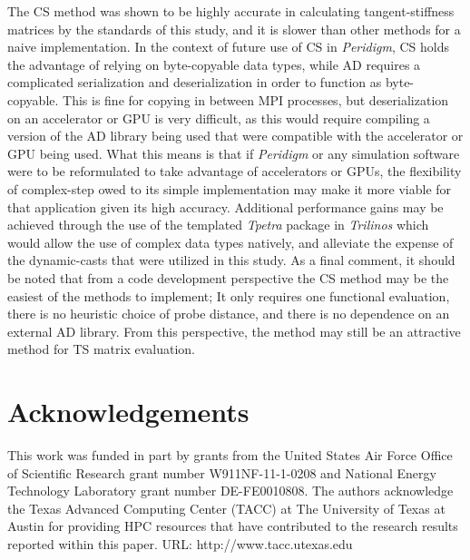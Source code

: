 \documentclass[preprint,12pt]{elsarticle}
\begin{document}
The CS method was shown to be highly accurate in calculating tangent-stiffness matrices by the standards of this study, and it is slower than other methods for a naive implementation. In the context of future use of CS in \emph{Peridigm}, CS holds the advantage of relying on byte-copyable data types, while AD requires a complicated serialization and deserialization in order to function as byte-copyable. This is fine for copying in between MPI processes, but deserialization on an accelerator or GPU is very difficult, as this would require compiling a version of the AD library being used that were compatible with the accelerator or GPU being used. What this means is that if \emph{Peridigm} or any simulation software were to be reformulated to take advantage of accelerators or GPUs, the flexibility of complex-step owed to its simple implementation may make it more viable for that application given its high accuracy. Additional performance gains may be achieved through the use of the templated \emph{Tpetra} package in \emph{Trilinos} which would allow the use of complex data types natively, and alleviate the expense of the dynamic-casts that were utilized in this study.  As a final comment, it should be noted that from a code development perspective the CS method may be the easiest of the methods to implement; It only requires one functional evaluation, there is no heuristic choice of probe distance, and there is no dependence on an external AD library.  From this perspective, the method may still be an attractive method for TS matrix evaluation.



\section{Acknowledgements}
\label{sec:ack}
This work was funded in part by grants from the United States Air Force Office of Scientific Research grant number W911NF-11-1-0208 and National Energy Technology Laboratory grant number DE-FE0010808. The authors acknowledge the Texas Advanced Computing Center (TACC) at The University of Texas at Austin for providing HPC resources that have contributed to the research results reported within this paper. URL: http://www.tacc.utexas.edu

\end{document}
